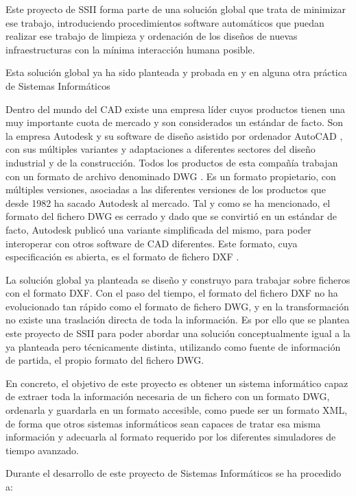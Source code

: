 Este proyecto de SSII forma parte de una solución global que trata de minimizar ese trabajo, introduciendo procedimientos software automáticos que puedan realizar ese trabajo de limpieza y ordenación de los diseños de nuevas infraestructuras con la mínima interacción humana posible.

Esta solución global ya ha sido planteada y probada en \cite{Miguel-Munoz} y en alguna otra práctica de Sistemas Informáticos \cite{Miguel-Munoz-SSII} \cite{Javier-Cabrera-SSII}

Dentro del mundo del CAD existe una empresa líder cuyos productos tienen una muy importante cuota de mercado y son considerados un estándar de facto. Son la empresa Autodesk y su software de diseño asistido por ordenador AutoCAD , con sus múltiples variantes y adaptaciones a diferentes sectores del diseño industrial y de la construcción. Todos los productos de esta compañía trabajan con un formato de archivo denominado DWG \cite{DWG-file-history}. Es un formato propietario, con múltiples versiones, asociadas a las diferentes versiones de los productos que desde 1982 ha sacado Autodesk al mercado. Tal y como se ha mencionado, el formato del fichero DWG es cerrado y dado que se convirtió en un estándar de facto, Autodesk publicó una variante simplificada del mismo, para poder interoperar con otros software de CAD diferentes. Este formato, cuya especificación es abierta, es el formato de fichero DXF \cite{DXF-file-history}. 

La solución global ya planteada \cite{Miguel-Munoz} se diseño y construyo para trabajar sobre ficheros con el formato DXF. Con el paso del tiempo, el formato del fichero DXF no ha evolucionado tan rápido como el formato de fichero DWG, y en la transformación no existe una traslación directa de toda la información. Es por ello que se plantea este proyecto de SSII para poder abordar una solución conceptualmente igual a la ya planteada pero técnicamente distinta, utilizando como fuente de información de partida, el propio formato del fichero DWG.

En concreto, el objetivo de este proyecto es obtener un sistema informático capaz de extraer toda la información necesaria de un fichero con un formato DWG, ordenarla y guardarla en un formato accesible, como puede ser un formato XML, de forma que otros sistemas informáticos sean capaces de tratar esa misma información y adecuarla al formato requerido por los diferentes simuladores de tiempo avanzado. 

Durante el desarrollo de este proyecto de Sistemas Informáticos se ha procedido a:

